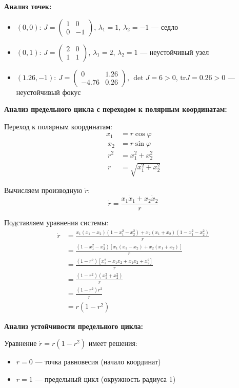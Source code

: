\textbf{Анализ точек:}
\begin{itemize}
\item $(0, 0)$: $J = \begin{pmatrix} 1 & 0 \\ 0 & -1 \end{pmatrix}$, $\lambda_1 = 1$, $\lambda_2 = -1$ --- седло
\item $(0, 1)$: $J = \begin{pmatrix} 2 & 0 \\ 1 & 1 \end{pmatrix}$, $\lambda_1 = 2$, $\lambda_2 = 1$ --- неустойчивый узел
\item $(1.26, -1)$: $J = \begin{pmatrix} 0 & 1.26 \\ -4.76 & 0.26 \end{pmatrix}$, $\det J = 6 > 0$, $\text{tr} J = 0.26 > 0$ --- неустойчивый фокус
\end{itemize}

\textbf{Анализ предельного цикла с переходом к полярным координатам:}

Переход к полярным координатам:
\begin{align}
x_1 &= r\cos\varphi \\\
x_2 &= r\sin\varphi \\\
r^2 &= x_1^2 + x_2^2 \\\
r &= \sqrt{x_1^2 + x_2^2}
\end{align}

Вычисляем производную $\dot{r}$:
$$\dot{r} = \frac{x_1\dot{x}_1 + x_2\dot{x}_2}{r}$$

Подставляем уравнения системы:
\begin{align}
\dot{r} &= \frac{x_1(x_1 - x_2)(1 - x_1^2 - x_2^2) + x_2(x_1 + x_2)(1 - x_1^2 - x_2^2)}{r} \\\
&= \frac{(1 - x_1^2 - x_2^2)[x_1(x_1 - x_2) + x_2(x_1 + x_2)]}{r} \\\
&= \frac{(1 - r^2)[x_1^2 - x_1x_2 + x_1x_2 + x_2^2]}{r} \\\
&= \frac{(1 - r^2)(x_1^2 + x_2^2)}{r} \\\
&= \frac{(1 - r^2)r^2}{r} \\\
&= r(1 - r^2)
\end{align}

\textbf{Анализ устойчивости предельного цикла:}

Уравнение $\dot{r} = r(1 - r^2)$ имеет решения:
\begin{itemize}
\item $r = 0$ --- точка равновесия (начало координат)
\item $r = 1$ --- предельный цикл (окружность радиуса 1)
\end{itemize}


